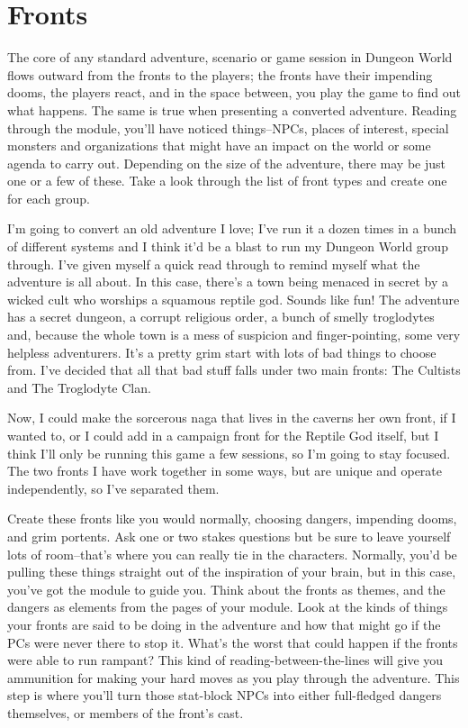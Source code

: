 \section*{Fronts}


 The core of any standard adventure, scenario or game session in Dungeon World flows outward from the fronts to the players; the fronts have their impending dooms, the players react, and in the space between, you play the game to find out what happens. The same is true when presenting a converted adventure. Reading through the module, you'll have noticed things--NPCs, places of interest, special monsters and organizations that might have an impact on the world or some agenda to carry out. Depending on the size of the adventure, there may be just one or a few of these. Take a look through the list of front types and create one for each group.


 I'm going to convert an old adventure I love; I've run it a dozen times in a bunch of different systems and I think it'd be a blast to run my Dungeon World group through. I've given myself a quick read through to remind myself what the adventure is all about. In this case, there's a town being menaced in secret by a wicked cult who worships a squamous reptile god. Sounds like fun! The adventure has a secret dungeon, a corrupt religious order, a bunch of smelly troglodytes and, because the whole town is a mess of suspicion and finger-pointing, some very helpless adventurers. It's a pretty grim start with lots of bad things to choose from. I've decided that all that bad stuff falls under two main fronts: The Cultists and The Troglodyte Clan.


 Now, I could make the sorcerous naga that lives in the caverns her own front, if I wanted to, or I could add in a campaign front for the Reptile God itself, but I think I'll only be running this game a few sessions, so I'm going to stay focused. The two fronts I have work together in some ways, but are unique and operate independently, so I've separated them.


 Create these fronts like you would normally, choosing dangers, impending dooms, and grim portents. Ask one or two stakes questions but be sure to leave yourself lots of room--that's where you can really tie in the characters. Normally, you'd be pulling these things straight out of the inspiration of your brain, but in this case, you've got the module to guide you. Think about the fronts as themes, and the dangers as elements from the pages of your module. Look at the kinds of things your fronts are said to be doing in the adventure and how that might go if the PCs were never there to stop it. What's the worst that could happen if the fronts were able to run rampant? This kind of reading-between-the-lines will give you ammunition for making your hard moves as you play through the adventure. This step is where you'll turn those stat-block NPCs into either full-fledged dangers themselves, or members of the front's cast.


